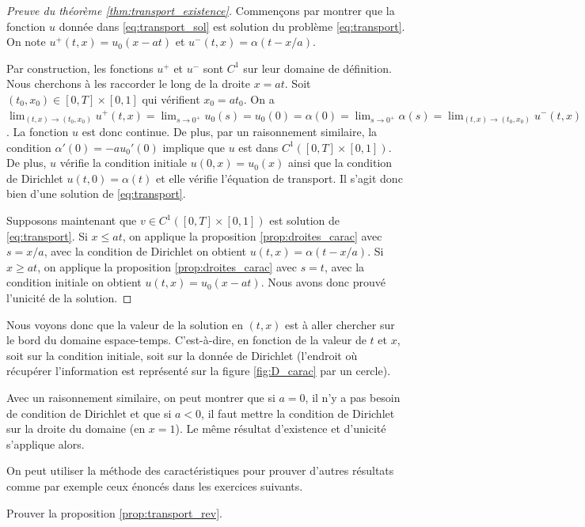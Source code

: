 \documentclass[12pt,a4paper,twoside]{article}
\begin{document}
\begin{proof}[Preuve du th\'eor\`eme \ref{thm:transport_existence}]
  Commen\c{c}ons par montrer que la fonction $u$ donn\'ee dans \eqref{eq:transport_sol}
  est solution du probl\`eme \eqref{eq:transport}.
  On note $u^+(t,x) = u_0(x-at)$ et $u^-(t,x) = \alpha(t-x/a)$.

  Par construction, les fonctions $u^+$ et $u^-$ sont $C^1$ sur leur domaine de 
  d\'efinition. Nous cherchons \`a les raccorder le long de la droite $x=at$.
  Soit $(t_0,x_0) \in [0,T] \times [0,1]$ qui v\'erifient $x_0 = at_0$.
  On a $\lim_{(t,x) \to (t_0,x_0)} u^+(t,x) = \lim_{s \to 0^+} u_0(s) = u_0(0)
  = \alpha(0) = \lim_{s \to 0^+} \alpha(s) = \lim_{(t,x) \to (t_0,x_0)} u^-(t,x)$.
  La fonction $u$ est donc continue.
  De plus, par un raisonnement similaire, la condition $\alpha'(0) = -au_0'(0)$
  implique que $u$ est dans $C^1([0,T]\times [0,1])$.
  De plus, $u$ v\'erifie la condition initiale $u(0,x) = u_0(x)$ ainsi que la condition
  de Dirichlet $u(t,0) = \alpha(t)$ et elle v\'erifie l'\'equation de transport.
  Il s'agit donc bien d'une solution de \eqref{eq:transport}.

  Supposons maintenant que $v \in C^1([0,T] \times [0,1])$ est solution de
  \eqref{eq:transport}.
  Si $x \leq a t$, on applique la proposition \ref{prop:droites_carac}
  avec $s=x/a$, avec la condition de Dirichlet
  on obtient $u(t,x) = \alpha(t-x/a)$.
  Si $x \geq a t$, on applique la proposition \ref{prop:droites_carac}
  avec $s=t$, avec la condition initiale on obtient $u(t,x) = u_0(x-at)$.
  Nous avons donc prouv\'e l'unicit\'e de la solution.
\end{proof}


Nous voyons donc que la valeur de la solution en $(t,x)$ est \`a aller chercher
sur le bord du domaine espace-temps. C'est-\`a-dire, en fonction de la valeur de 
$t$ et $x$, soit sur la condition initiale, soit sur la donn\'ee de Dirichlet
(l'endroit o\`u r\'ecup\'erer l'information est repr\'esent\'e sur la figure
\ref{fig:D_carac} par un cercle).


\begin{remark}
  Avec un raisonnement similaire, on peut montrer que si $a=0$, il n'y a pas besoin 
  de condition de Dirichlet et que si $a<0$, il faut mettre la condition de Dirichlet
  sur la droite du domaine (en $x=1$). 
  Le m\^eme r\'esultat d'existence et d'unicit\'e s'applique alors.
\end{remark}

On peut utiliser la m\'ethode des caract\'eristiques pour prouver d'autres r\'esultats
comme par exemple ceux \'enonc\'es dans les exercices suivants.
\begin{exercise}
  Prouver la proposition \ref{prop:transport_rev}.
\end{exercise}
\end{document}
